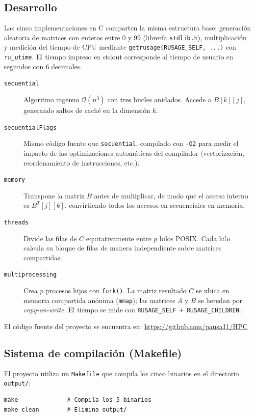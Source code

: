 \documentclass{article}
\begin{document}
\subsection{Desarrollo}

Las cinco implementaciones en C comparten la misma estructura base: generación aleatoria de matrices con enteros entre 0 y 99 (librería \texttt{stdlib.h}), multiplicación y medición del tiempo de CPU mediante \texttt{getrusage(RUSAGE\_SELF, ...)} con \texttt{ru\_utime}. El tiempo impreso en stdout corresponde al tiempo de usuario en segundos con 6 decimales.

\begin{description}
    \item[\texttt{secuential}] Algoritmo ingenuo $\mathcal{O}(n^3)$ con tres bucles anidados. Accede a $B[k][j]$, generando saltos de caché en la dimensión $k$.
    \item[\texttt{secuentialFlags}] Mismo código fuente que \texttt{secuential}, compilado con \texttt{-O2} para medir el impacto de las optimizaciones automáticas del compilador (vectorización, reordenamiento de instrucciones, etc.).
    \item[\texttt{memory}] Transpone la matriz $B$ antes de multiplicar, de modo que el acceso interno es $B^T[j][k]$, convirtiendo todos los accesos en secuenciales en memoria.
    \item[\texttt{threads}] Divide las filas de $C$ equitativamente entre $p$ hilos POSIX. Cada hilo calcula su bloque de filas de manera independiente sobre matrices compartidas.
    \item[\texttt{multiprocessing}] Crea $p$ procesos hijos con \texttt{fork()}. La matriz resultado $C$ se ubica en memoria compartida anónima (\texttt{mmap}); las matrices $A$ y $B$ se heredan por \emph{copy-on-write}. El tiempo se mide con \texttt{RUSAGE\_SELF + RUSAGE\_CHILDREN}.
\end{description}

El código fuente del proyecto se encuentra en: \url{https://github.com/pausa11/HPC}

\subsection{Sistema de compilación (Makefile)}

El proyecto utiliza un \texttt{Makefile} que compila los cinco binarios en el directorio \texttt{output/}:

\begin{verbatim}
make              # Compila los 5 binarios
make clean        # Elimina output/
\end{verbatim}
\end{document}
